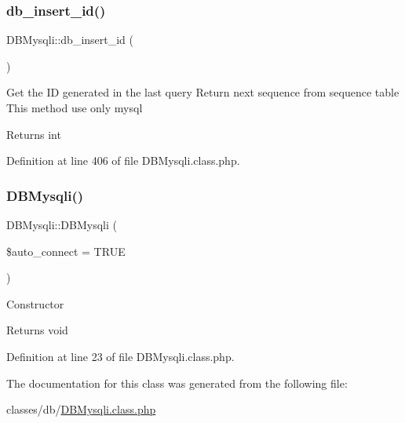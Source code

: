 \subsubsection{\texorpdfstring{db\+\_\+insert\+\_\+id()}{db\_insert\_id()}}
{\footnotesize\ttfamily D\+B\+Mysqli\+::db\+\_\+insert\+\_\+id (\begin{DoxyParamCaption}{ }\end{DoxyParamCaption})}

Get the ID generated in the last query Return next sequence from sequence table This method use only mysql \begin{DoxyReturn}{Returns}
int 
\end{DoxyReturn}


Definition at line 406 of file D\+B\+Mysqli.\+class.\+php.

\hypertarget{classDBMysqli_ab3cb2172fa087e11c06968914090b71d}{}\label{classDBMysqli_ab3cb2172fa087e11c06968914090b71d} 
\subsubsection{\texorpdfstring{D\+B\+Mysqli()}{DBMysqli()}}
{\footnotesize\ttfamily D\+B\+Mysqli\+::\+D\+B\+Mysqli (\begin{DoxyParamCaption}\item[{}]{\$auto\+\_\+connect = {\ttfamily TRUE} }\end{DoxyParamCaption})}

Constructor \begin{DoxyReturn}{Returns}
void 
\end{DoxyReturn}


Definition at line 23 of file D\+B\+Mysqli.\+class.\+php.



The documentation for this class was generated from the following file\+:\begin{DoxyCompactItemize}
\item 
classes/db/\hyperlink{DBMysqli_8class_8php}{D\+B\+Mysqli.\+class.\+php}\end{DoxyCompactItemize}
